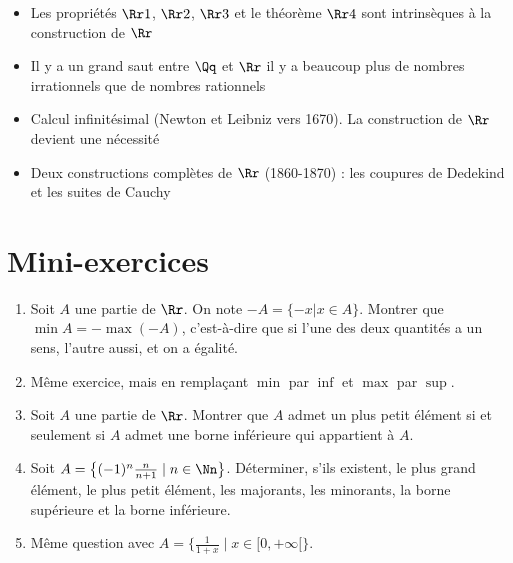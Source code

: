 \begin{frame}
\begin{itemize}[<+->]
  \item Les propriétés $\Rr1$, $\Rr2$, $\Rr3$ et le théorème $\Rr4$
sont intrinsèques à la construction de $\Rr$

  \item Il y a un grand saut entre $\Qq$ et $\Rr$ 
 \og{}il y a beaucoup plus de nombres irrationnels que de nombres rationnels \fg{}


  \item Calcul infinitésimal (Newton et Leibniz vers 1670). La construction de $\Rr$ devient 
  une nécessité

  \item Deux constructions complètes de $\Rr$ (1860-1870) : les coupures de Dedekind et les suites de Cauchy


\end{itemize}
\end{frame}



\section*{Mini-exercices}


\begin{frame}
\begin{miniexercice}
\begin{enumerate}
  \item Soit $A$ une partie de $\Rr$. On note $-A=\{-x| x\in A\}$. Montrer que $\min A=-\max(-A)$, 
c'est-à-dire que si l'une des deux quantités a un sens, l'autre aussi, et on a égalité.
  \item Même exercice, mais en remplaçant $\min$ par $\inf$ et $\max$ par $\sup$.
  \item Soit $A$ une partie de $\Rr$. Montrer que $A$ admet un plus petit 
élément si et seulement si $A$ admet une borne inférieure qui appartient à $A$.
  \item Soit $A=\big\{(-1)^n \frac{n}{n+1}\mid n\in \Nn\big\}$. Déterminer, s'ils existent, le plus grand élément, le plus petit élément,
les majorants, les minorants, la borne supérieure et la borne inférieure.
  \item Même question avec $A= \big\{ \frac{1}{1+x} \mid x \in [0,+\infty[ \big\}$.
  \end{enumerate}
\end{miniexercice}
\end{frame}


